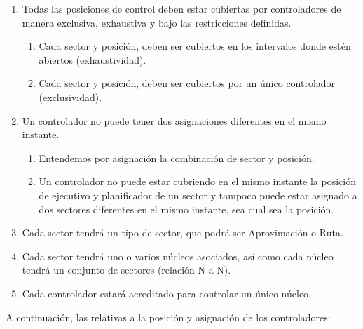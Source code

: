 \begin{enumerate}[label={\textbf{RD\arabic*}}, ref={Requisito RD\arabic*},  align=left]
	
	\item Todas las posiciones de control deben estar cubiertas por controladores de manera exclusiva, exhaustiva y bajo las restricciones definidas.
	\begin{enumerate}[label*={\textbf{.\arabic*}}]
		\item Cada sector y posición, deben ser cubiertos en los intervalos donde estén abiertos (exhaustividad).
		\item Cada sector y posición, deben ser cubiertos por un único controlador (exclusividad).
	\end{enumerate}
	
	\item Un controlador no puede tener dos asignaciones diferentes en el mismo instante.
	\begin{enumerate}[label*={\textbf{.\arabic*}}]
		\item Entendemos por asignación la combinación de sector y posición.
		\item Un controlador no puede estar cubriendo en el mismo
		instante la posición de ejecutivo y planificador de un sector y tampoco puede estar
		asignado a dos sectores diferentes en el mismo instante, sea cual sea la posición.
	\end{enumerate}
	
	\item \label{RD:tipos-sector}  Cada sector tendrá un tipo de sector, que podrá ser Aproximación o Ruta.
	
	\item  \label{RD:sector-nucleo} Cada sector tendrá uno o varios núcleos asociados, así como cada núcleo tendrá un conjunto de sectores (relación N a N).
	
	\item \label{RD:nucleo-controlador} Cada controlador estará acreditado para controlar un único núcleo.
	
\end{enumerate}



A continuación, las relativas a la posición y asignación de los controladores:


